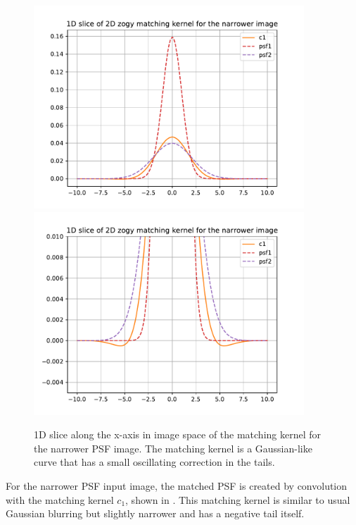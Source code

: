 \documentclass[11pt]{article}
\begin{document}
\begin{figure}
\begin{center}
\includegraphics[width=4in]{fig/zogy_theo_Gaussians_img_c1.pdf}
\includegraphics[width=4in]{fig/zogy_theo_Gaussians_img_c1_tails.pdf}
\end{center}
\caption{\label{fig:theo_Gaussians_img_c1}1D slice along the x-axis in image
  space of the matching kernel for the narrower PSF image. The matching
  kernel is a Gaussian-like curve that has a small oscillating correction in
  the tails.}
\end{figure}
%
\par For the narrower PSF input image, the matched PSF is created by
convolution with the matching kernel \(c_1\), shown in
. This matching kernel is similar to usual
Gaussian blurring but slightly narrower and has a negative tail itself.
%
\end{document}
